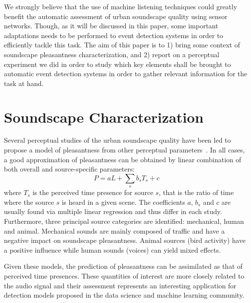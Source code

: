\documentclass{article}
\begin{document}
\begin{sloppy}

We strongly believe that the use of machine listening techniques could greatly benefit the automatic assessment of urban soundscape quality using sensor networks. Though, as it will be discussed in this paper, some important adaptations needs to be performed to event detection systems in order to efficiently tackle this task. The aim of this paper is to 1) bring some context of soundscape pleasantness characterization, and 2) report on a perceptual experiment we did in order to study which key elements shall be brought to automatic event detection systems in order to gather relevant information for the task at hand.

\clearpage

\section{Soundscape Characterization}
\label{sec:char}
Several perceptual studies of the urban soundscape quality have been led to propose a model of pleasantness from other perceptual parameters~\cite{nilsson2007, axelsson2010, aumond2017, ricciardi2014}. In all cases, a good approximation of pleasantness can be obtained by linear combination of both overall and source-specific parameters:
\begin{equation}
P = aL + \sum_s b_sT_s + c
\end{equation}
where $T_s$ is the perceived time presence for source $s$, that is the ratio of time where the source $s$ is heard in a given scene. The coefficients $a$, $b_s$ and $c$ are usually found via multiple linear regression and thus differ in each study.
Furthermore, three principal source categories are identified: mechanical, human and animal. Mechanical sounds are mainly composed of traffic and have a negative impact on soundscape pleasantness. Animal sources (bird activity) have a positive influence while human sounds (voices) can yield mixed effects.

Given these models, the prediction of pleasantness can be assimilated as that of perceived time presences. These quantities of interest are more closely related to the audio signal and their assessment represents an interesting application for detection models proposed in the data science and machine learning community.


\end{sloppy}
\end{document}

